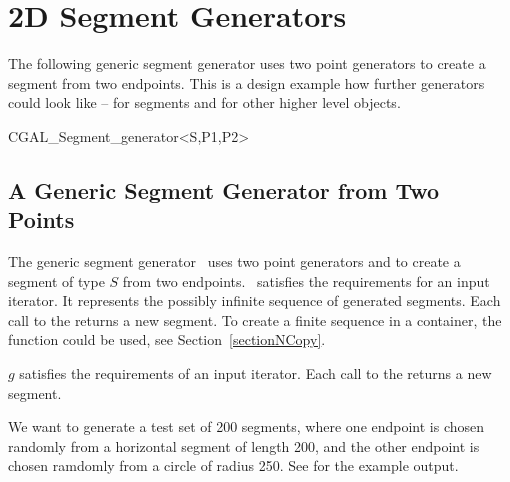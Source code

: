 \newpage
\section{2D Segment Generators}

The following generic segment generator uses two point generators to
create a segment from two endpoints. This is a design example how
further generators could look like -- for segments and for other
higher level objects.


\begin{ccClassTemplate}{CGAL_Segment_generator<S,P1,P2>}
\subsection{A Generic Segment Generator from Two Points}

\ccDefinition

The generic segment generator \ccClassTemplateName\ uses two point
generators  and  to create a segment of type $S$ from
two endpoints.  \ccClassTemplateName\ satisfies the requirements for
an input iterator. It represents the possibly infinite sequence of
generated segments. Each call to the  returns a new
segment. To create a finite sequence in a container, the function
 could be used, see Section~\ref{sectionNCopy}.


\ccCreation


\ccOperations

$g$ satisfies the requirements of an input iterator. Each call to the
 returns a new segment. 

\ccExample

We want to generate a test set of 200 segments, where one endpoint is
chosen randomly from a horizontal segment of length 200, and the other
endpoint is chosen ramdomly from a circle of radius 250. See
 for the example
output.


\end{ccClassTemplate}
